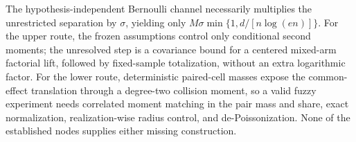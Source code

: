 The hypothesis-independent Bernoulli channel necessarily multiplies the unrestricted separation by \(\sigma\), yielding only \(M\sigma\min\{1,d/[n\log(en)]\}\).  For the upper route, the frozen assumptions control only conditional second moments; the unresolved step is a covariance bound for a centered mixed-arm factorial lift, followed by fixed-sample totalization, without an extra logarithmic factor.  For the lower route, deterministic paired-cell masses expose the common-effect translation through a degree-two collision moment, so a valid fuzzy experiment needs correlated moment matching in the pair mass and share, exact normalization, realization-wise radius control, and de-Poissonization.  None of the established nodes supplies either missing construction.